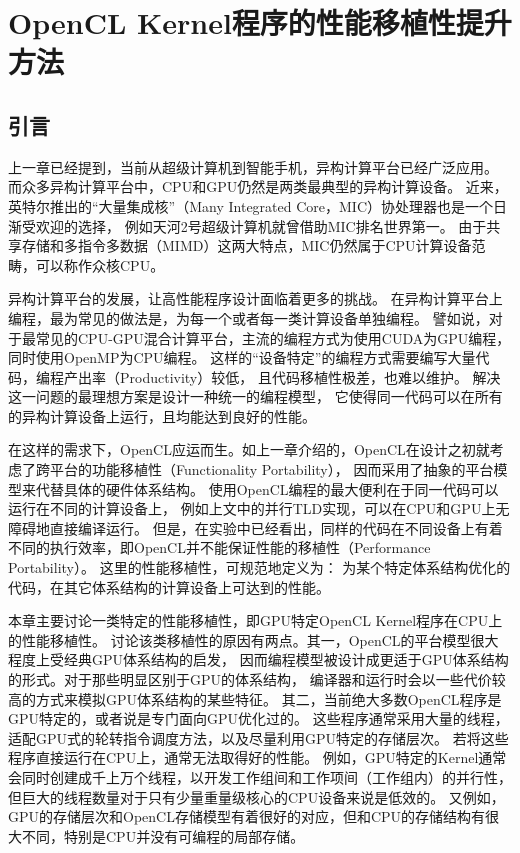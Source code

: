 \chapter{OpenCL Kernel程序的性能移植性提升方法}
\section{引言}
上一章已经提到，当前从超级计算机到智能手机，异构计算平台已经广泛应用。
而众多异构计算平台中，CPU和GPU仍然是两类最典型的异构计算设备。
近来，英特尔推出的``大量集成核''（Many Integrated Core，MIC）协处理器也是一个日渐受欢迎的选择，
例如天河2号超级计算机就曾借助MIC排名世界第一。
由于共享存储和多指令多数据（MIMD）这两大特点，MIC仍然属于CPU计算设备范畴，可以称作众核CPU。

异构计算平台的发展，让高性能程序设计面临着更多的挑战。
在异构计算平台上编程，最为常见的做法是，为每一个或者每一类计算设备单独编程。
譬如说，对于最常见的CPU-GPU混合计算平台，主流的编程方式为使用CUDA为GPU编程，
同时使用OpenMP为CPU编程。
这样的``设备特定''的编程方式需要编写大量代码，编程产出率（Productivity）较低，
且代码移植性极差，也难以维护。
解决这一问题的最理想方案是设计一种统一的编程模型，
它使得同一代码可以在所有的异构计算设备上运行，且均能达到良好的性能。

在这样的需求下，OpenCL应运而生。如上一章介绍的，OpenCL在设计之初就考虑了跨平台的功能移植性（Functionality Portability），
因而采用了抽象的平台模型来代替具体的硬件体系结构。
使用OpenCL编程的最大便利在于同一代码可以运行在不同的计算设备上，
例如上文中的并行TLD实现，可以在CPU和GPU上无障碍地直接编译运行。
但是，在实验中已经看出，同样的代码在不同设备上有着不同的执行效率，即OpenCL并不能保证性能的移植性（Performance Portability）。
这里的性能移植性，可规范地定义为：
为某个特定体系结构优化的代码，在其它体系结构的计算设备上可达到的性能。

本章主要讨论一类特定的性能移植性，即GPU特定OpenCL Kernel程序在CPU上的性能移植性。
讨论该类移植性的原因有两点。其一，OpenCL的平台模型很大程度上受经典GPU体系结构的启发，
因而编程模型被设计成更适于GPU体系结构的形式。对于那些明显区别于GPU的体系结构，
编译器和运行时会以一些代价较高的方式来模拟GPU体系结构的某些特征。
其二，当前绝大多数OpenCL程序是GPU特定的，或者说是专门面向GPU优化过的。
这些程序通常采用大量的线程，适配GPU式的轮转指令调度方法，以及尽量利用GPU特定的存储层次。
若将这些程序直接运行在CPU上，通常无法取得好的性能。
例如，GPU特定的Kernel通常会同时创建成千上万个线程，以开发工作组间和工作项间（工作组内）的并行性，
但巨大的线程数量对于只有少量重量级核心的CPU设备来说是低效的。
又例如，GPU的存储层次和OpenCL存储模型有着很好的对应，但和CPU的存储结构有很大不同，特别是CPU并没有可编程的局部存储。

